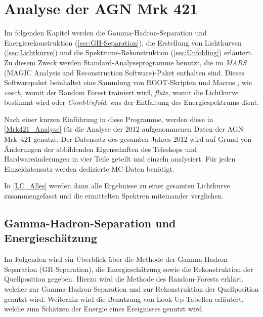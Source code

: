 \chapter{Analyse der AGN Mrk 421}
\label{chapter:Analyse}

Im folgenden Kapitel werden die Gamma-Hadron-Separation und Energierekonstruktion (\autoref{sec:GH-Separation}), die Erstellung von Lichtkurven (\autoref{sec:Lichtkurve}) und die Spektrums-Rekonstruktion (\autoref{sec:Unfolding}) erläutert.
Zu diesem Zweck werden Standard-Analyseprogramme benutzt, die im \textit{MARS} (MAGIC Analysis and Reconstruction Software)-Paket enthalten sind.
Dieses Softwarepaket beinhaltet eine Sammlung von ROOT-Skripten und Macros \cite{MARS}, wie \textit{coach}, womit der Random Forest trainiert wird, \textit{flute}, womit die Lichtkurve bestimmt wird oder \textit{CombUnfold}, was der Entfaltung des Energiespektrums dient. 

Nach einer kurzen Einführung in diese Programme, werden diese in \autoref{Mrk421_Analyse} für die Analyse der 2012 aufgenommenen Daten der AGN Mrk~421 genutzt.
Der Datensatz des gesamten Jahres 2012 wird auf Grund von Änderungen der abbildenden Eigenschaften des Teleskops und Hardwareänderungen in vier Teile geteilt und einzeln analysiert. 
Für jeden Einzeldatensatz werden dedizierte MC-Daten benötigt.

In \autoref{LC_Alles} werden dann alle Ergebnisse zu einer gesamten Lichtkurve zusammengefasst und die ermittelten Spektren miteinander verglichen.


\section{Gamma-Hadron-Separation und Energieschätzung}
\label{sec:GH-Separation}
Im Folgenden wird ein Überblick über die Methode der Gamma-Hadron-Separation (GH-Separation), die Energieschätzung sowie die Rekonstruktion der Quellposition gegeben.  
Hierzu wird die Methode des Random-Forests erklärt, welcher zur Gamma-Hadron-Separation und zur Rekonstruktion der Quellposition genutzt wird.
Weiterhin wird die Benutzung von Look-Up-Tabellen erläutert, welche zum Schätzen der Energie eines Ereignisses genutzt wird.


